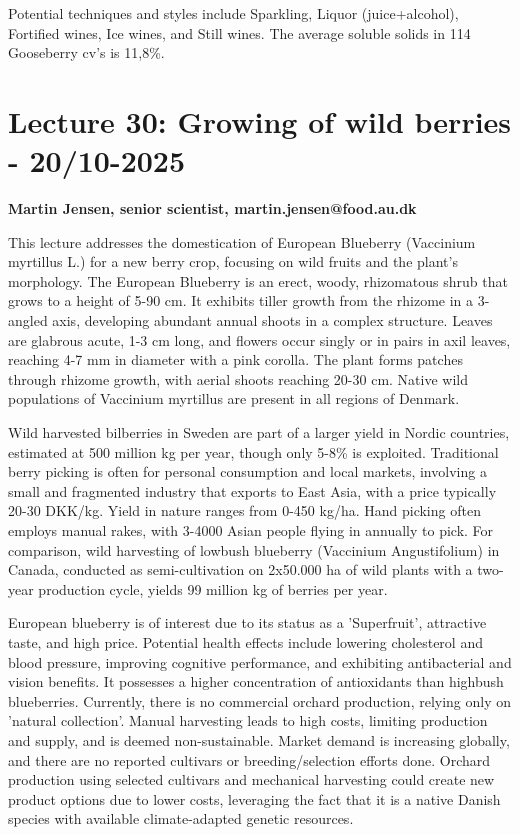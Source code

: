 \vspace{0.5em}
Potential techniques and styles include Sparkling, Liquor (juice+alcohol), Fortified wines, Ice wines, and Still wines. The average soluble solids in 114 Gooseberry cv's is 11,8\%.


\section{Lecture 30: Growing of wild berries - 20/10-2025}
\textbf{Martin Jensen, senior scientist, martin.jensen@food.au.dk}

\vspace{1em}
This lecture addresses the domestication of European Blueberry (Vaccinium myrtillus L.) for a new berry crop, focusing on wild fruits and the plant's morphology. The European Blueberry is an erect, woody, rhizomatous shrub that grows to a height of 5-90 cm. It exhibits tiller growth from the rhizome in a 3-angled axis, developing abundant annual shoots in a complex structure. Leaves are glabrous acute, 1-3 cm long, and flowers occur singly or in pairs in axil leaves, reaching 4-7 mm in diameter with a pink corolla. The plant forms patches through rhizome growth, with aerial shoots reaching 20-30 cm. Native wild populations of Vaccinium myrtillus are present in all regions of Denmark.

\vspace{0.5em}
Wild harvested bilberries in Sweden are part of a larger yield in Nordic countries, estimated at 500 million kg per year, though only 5-8\% is exploited. Traditional berry picking is often for personal consumption and local markets, involving a small and fragmented industry that exports to East Asia, with a price typically 20-30 DKK/kg. Yield in nature ranges from 0-450 kg/ha. Hand picking often employs manual rakes, with 3-4000 Asian people flying in annually to pick. For comparison, wild harvesting of lowbush blueberry (Vaccinium Angustifolium) in Canada, conducted as semi-cultivation on 2x50.000 ha of wild plants with a two-year production cycle, yields 99 million kg of berries per year.

\vspace{0.5em}
European blueberry is of interest due to its status as a 'Superfruit', attractive taste, and high price. Potential health effects include lowering cholesterol and blood pressure, improving cognitive performance, and exhibiting antibacterial and vision benefits. It possesses a higher concentration of antioxidants than highbush blueberries. Currently, there is no commercial orchard production, relying only on 'natural collection'. Manual harvesting leads to high costs, limiting production and supply, and is deemed non-sustainable. Market demand is increasing globally, and there are no reported cultivars or breeding/selection efforts done. Orchard production using selected cultivars and mechanical harvesting could create new product options due to lower costs, leveraging the fact that it is a native Danish species with available climate-adapted genetic resources.

